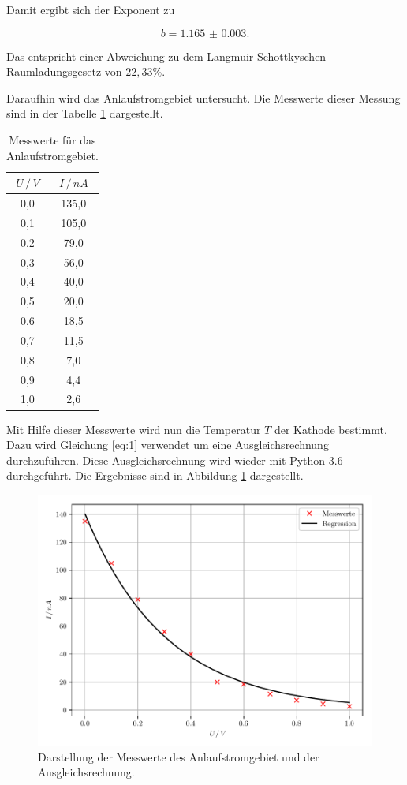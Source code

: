 Damit ergibt sich der Exponent zu

\begin{equation*}
  b = \num{1.165(3)}.
\end{equation*}

Das entspricht einer Abweichung zu dem Langmuir-Schottkyschen Raumladungsgesetz von $22,33 \%$.

Daraufhin wird das Anlaufstromgebiet untersucht. Die Messwerte dieser Messung sind
in der Tabelle \ref{tab:3} dargestellt.

\begin{table}[H]
  \centering
  \caption{Messwerte für das Anlaufstromgebiet.}
  \label{tab:3}
  \begin{tabular}{c c}
    \toprule
    $ U \, / \, V$ & $ I \, / \, nA$ \\
    \midrule
    0,0 & 135,0 \\
    0,1 & 105,0 \\
    0,2 &  79,0 \\
    0,3 &  56,0 \\
    0,4 &  40,0 \\
    0,5 &  20,0 \\
    0,6 &  18,5 \\
    0,7 &  11,5 \\
    0,8 &   7,0 \\
    0,9 &   4,4 \\
    1,0 &   2,6 \\
    \bottomrule
  \end{tabular}
\end{table}

Mit Hilfe dieser Messwerte wird nun die Temperatur $T$ der Kathode bestimmt.
Dazu wird Gleichung \ref{eq:1} verwendet um eine Ausgleichsrechnung durchzuführen.
Diese Ausgleichsrechnung wird wieder mit Python 3.6 durchgeführt. Die Ergebnisse sind
in Abbildung \ref{abb:8} dargestellt.

\begin{figure}[H]
  \centering
  \includegraphics{plot3.pdf}
  \caption{Darstellung der Messwerte des Anlaufstromgebiet und der Ausgleichsrechnung.}
  \label{abb:8}
\end{figure}


